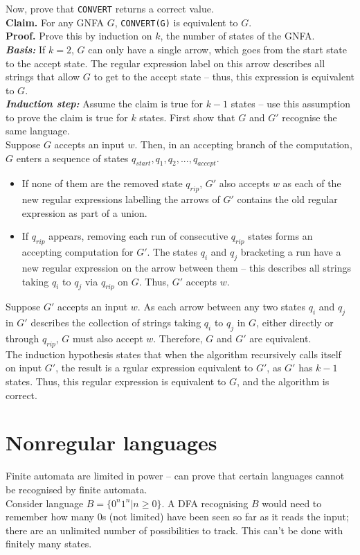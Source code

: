 \documentclass{article}
\begin{document}
Now, prove that \texttt{CONVERT} returns a correct value.\medskip
\\\textbf{Claim.} For any GNFA $G$, \texttt{CONVERT(G)} is equivalent to $G$.\medskip
\\\textbf{Proof.} Prove this by induction on $k$, the number of states of the GNFA.\medskip
\\\textit{\textbf{Basis:}} If $k=2$, $G$ can only have a single arrow, which goes from the start state to the accept state. The regular expression label on this arrow describes all strings that allow $G$ to get to the accept state -- thus, this expression is equivalent to $G$.\medskip
\\\textit{\textbf{Induction step:}} Assume the claim is true for $k-1$ states -- use this assumption to prove the claim is true for $k$ states. First show that $G$ and $G'$ recognise the same language.\medskip
\\Suppose $G$ accepts an input $w$. Then, in an accepting branch of the computation, $G$ enters a sequence of states $q_{start}, q_1, q_2, ..., q_{accept}$.
\begin{itemize}
	\item If none of them are the removed state $q_{rip}$, $G'$ also accepts $w$ as each of the new regular expressions labelling the arrows of $G'$ contains the old regular expression as part of a union.
	\item If $q_{rip}$ appears, removing each run of consecutive $q_{rip}$ states forms an accepting computation for $G'$. The states $q_i$ and $q_j$ bracketing a run have a new regular expression on the arrow between them -- this describes all strings taking $q_i$ to $q_j$ via $q_{rip}$ on $G$. Thus, $G'$ accepts $w$.
\end{itemize}
Suppose $G'$ accepts an input $w$. As each arrow between any two states $q_i$ and $q_j$ in $G'$ describes the collection of strings taking $q_i$ to $q_j$ in $G$, either directly or through $q_{rip}$, $G$ must also accept $w$. Therefore, $G$ and $G'$ are equivalent.\medskip
\\The induction hypothesis states that when the algorithm recursively calls itself on input $G'$, the result is a rgular expression equivalent to $G'$, as $G'$ has $k-1$ states. Thus, this regular expression is equivalent to $G$, and the algorithm is correct.

\section{Nonregular languages}
Finite automata are limited in power -- can prove that certain languages cannot be recognised by finite automata.\medskip
\\ Consider language $B = \{0^n1^n | n \geq 0\}$. A DFA recognising $B$ would need to remember how many $0$s (not limited) have been seen so far as it reads the input; there are an unlimited number of possibilities to track. This can't be done with finitely many states.
\end{document}
